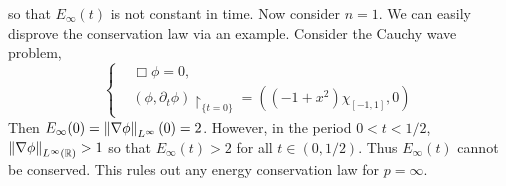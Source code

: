 \documentclass{article}
\begin{document}
so that $E_{\infty}(t)$ is not constant in time. Now consider $n= 1$. We can easily disprove the conservation law via an example. Consider the Cauchy wave problem, 
\begin{equation*}
	\left\{
	\begin{alignedat}{1}
		&\Box\phi = 0,\\
		&(\phi, \partial_{t}\phi)\upharpoonright_{\{t = 0\}} = ((-1 + x^{2})\chi_{[-1,1]}, 0)
	\end{alignedat}
	\right.
\end{equation*}
Then $E_{\infty}(0) = \left\Vert \nabla \phi \right\Vert_{L^{\infty}}(0) = 2$. However, in the period $0 < t < 1/2$, $\left\Vert \nabla \phi \right\Vert_{L^{\infty}(\mathbb{R})}> 1$ so that $E_{\infty}(t) > 2$ for all $t \in (0,1/2)$. Thus $E_{\infty}(t)$ cannot be conserved. This rules out any energy conservation law for $p = \infty$. 
\end{document}
